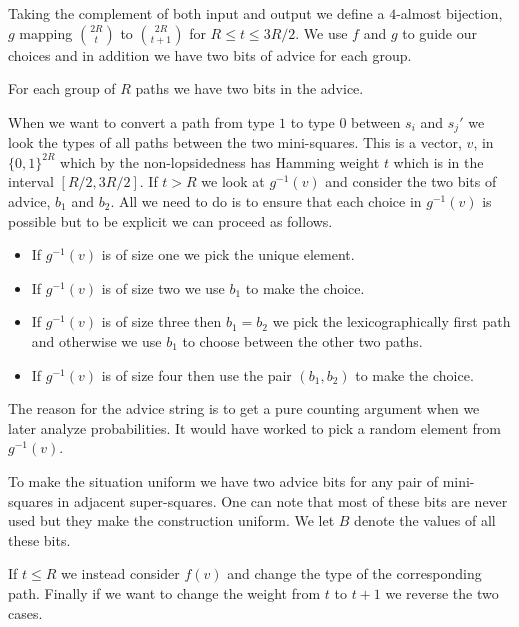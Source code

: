 \documentclass{article}\usepackage[a4paper,margin=20mm]{geometry}
\begin{document}
Taking the complement of both input and output
we define a $4$-almost bijection, $g$ mapping
$2R \choose t$ to $2R \choose {t+1}$ for $R \leq t \leq 3R/2$.
We use $f$ and $g$ to guide our choices and
in addition we have
two bits of advice for each group.

\begin{definition} \label{def:advice}
For each group of $R$ paths we have two bits in the 
advice.
\end{definition}

When we want to convert a path from type $1$ to type
$0$ between $s_i$ and $s_j'$ we look the types of all paths between
the two mini-squares.  This is a vector, $v$, in $\{ 0,1\}^{2R}$
which by the non-lopsidedness has Hamming weight
$t$ which is in the interval $[R/2,3R/2]$.
If $t> R$ we look at $g^{-1}(v)$ and consider the
two bits of advice, $b_1$ and $b_2$.  All we
need to do is to ensure that each choice
in $g^{-1}(v)$ is possible but to be explicit we
can proceed as follows.

\begin{itemize}

\item If $g^{-1}(v)$
is of size one we pick the unique element.  

\item If $g^{-1}(v)$
is of size two we use $b_1$ to make the choice.

\item If $g^{-1}(v)$
is of size three then $b_1=b_2$ we pick
the lexicographically first path and
otherwise we use $b_1$ to choose between
the other two paths.

\item If $g^{-1}(v)$
is of size four then use the pair $(b_1,b_2)$ to
make the choice.

\end{itemize}
The reason for the advice string is to get a pure counting
argument when we later analyze probabilities. It would
have worked to pick a random element from
$g^{-1}(v)$.

To make the situation uniform we have two
advice bits for any pair of mini-squares in adjacent
super-squares.  One can note that most of these bits are never used
but they make the construction uniform.
We let $B$ denote the values of all these bits.

If $t \leq R$ we instead consider $f(v)$ and change the type
of the corresponding path.  Finally if we want
to change the weight from $t$ to $t+1$ we reverse the two 
cases.
\end{document}
